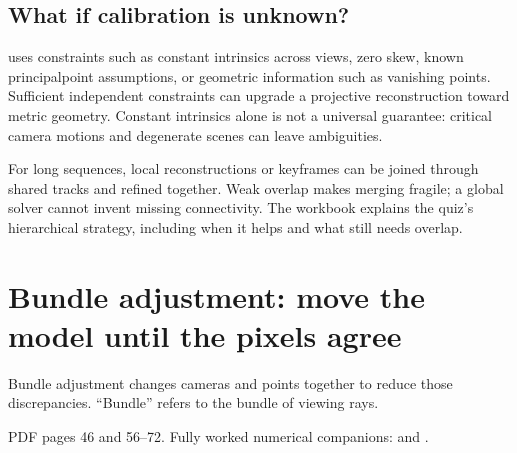 \documentclass[letterpaper,11pt,english,openany,oneside]{jupyterBook}
\begin{document}
\subsection{What if calibration is unknown?}
\label{\detokenize{lectures/lecture06/pipeline:what-if-calibration-is-unknown}}
\sphinxAtStartPar
{} uses constraints such as constant intrinsics across views, zero skew, known principal\sphinxhyphen{}point assumptions, or geometric information such as vanishing points. Sufficient independent constraints can upgrade a projective reconstruction toward metric geometry. Constant intrinsics alone is not a universal guarantee: critical camera motions and degenerate scenes can leave ambiguities.

\sphinxAtStartPar
For long sequences, local reconstructions or keyframes can be joined through shared tracks and refined together. Weak overlap makes merging fragile; a global solver cannot invent missing connectivity. The workbook explains the quiz’s hierarchical strategy, including when it helps and what still needs overlap.

\ignorespaces
{}\ignorespaces
{}\ignorespaces
\sphinxstepscope


\section{Bundle adjustment: move the model until the pixels agree}
\label{\detokenize{lectures/lecture06/optimization:bundle-adjustment-move-the-model-until-the-pixels-agree}}\label{\detokenize{lectures/lecture06/optimization:lec06-optimization}}\label{\detokenize{lectures/lecture06/optimization::doc}}
\sphinxAtStartPar
{} Bundle adjustment changes cameras and points together to reduce those discrepancies. “Bundle” refers to the bundle of viewing rays.

\sphinxAtStartPar
{} PDF pages 46 and 56–72. Fully worked numerical companions: {\hyperref[\detokenize{lectures/lecture06/quiz-workbook:quiz-a6-q1}]{}} and {\hyperref[\detokenize{lectures/lecture06/quiz-workbook:quiz-16-q1}]{}}.
\end{document}
